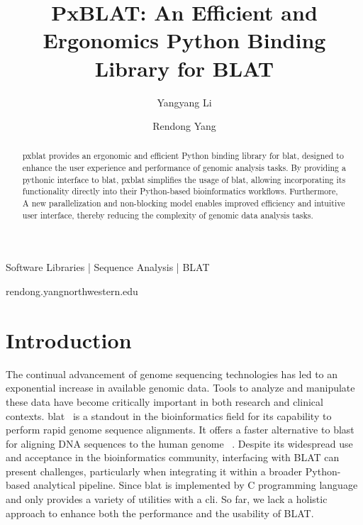 
\title{PxBLAT: An Efficient and Ergonomics Python Binding Library for BLAT}

\author[1]{Yangyang Li}
\author[1,\Letter]{Rendong Yang }
\date{}

\maketitle

\begin{abstract}
	\acrshort{pxblat} provides an ergonomic and efficient Python binding library for \acrshort{blat}, designed to enhance the user experience and performance of genomic analysis tasks.
	By providing a pythonic interface to \acrshort{blat}, \acrshort{pxblat} simplifies the usage of \acrshort{blat}, allowing incorporating its functionality directly into their Python-based bioinformatics workflows.
	Furthermore, A new parallelization and non-blocking model enables improved efficiency and intuitive user interface, thereby reducing the complexity of genomic data analysis tasks.
\end{abstract}


\begin{keywords}
	Software Libraries |  Sequence Analysis | BLAT
\end{keywords}

\begin{corrauthor}
	rendong.yang\at northwestern.edu
\end{corrauthor}

\section*{Introduction}\label{sec:introduction}

The continual advancement of genome sequencing technologies has led to an exponential increase in available genomic data.
Tools to analyze and manipulate these data have become critically important in both research and clinical contexts.
\acrfull{blat}~\citep{kent2002blat} is a standout in the bioinformatics field for its capability to perform rapid genome sequence alignments.
It offers a faster alternative to \acrfull{blast}~\citep{altschul1990basic}  for aligning DNA sequences to the human genome ~\citep{kent2002blat}.
Despite its widespread use and acceptance in the bioinformatics community, interfacing with BLAT can present challenges, particularly when integrating it within a broader Python-based analytical pipeline.
Since \acrshort{blat} is implemented by C programming language and only provides a variety of utilities with a \acrfull{cli}.
So far, we lack a holistic approach to enhance both the performance and the usability of BLAT.

